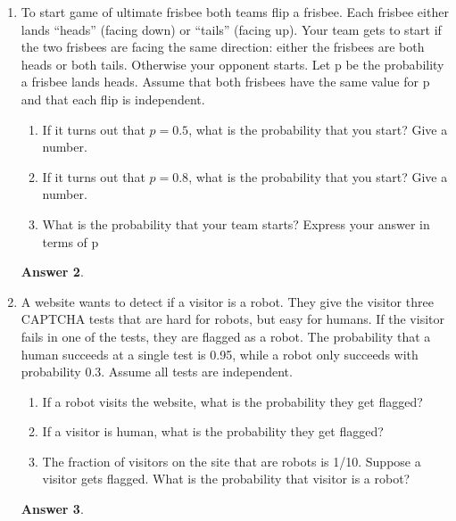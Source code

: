\documentclass[12pt]{article}
\renewcommand{\(}{\left(}
\renewcommand{\)}{\right)}
\theoremstyle{definition}
\newtheorem*{answer}{Answer}
\begin{document}
\begin{enumerate}
\begin{shaded}
\begin{answer}
    \end{answer}
    \end{shaded}
    \pagebreak
    \item To start game of ultimate frisbee both teams flip a frisbee. Each frisbee either lands ``heads''
(facing down) or ``tails'' (facing up). Your team gets to start if the two frisbees are facing the
same direction: either the frisbees are both heads or both tails. Otherwise your opponent starts.
Let p be the probability a frisbee lands heads. Assume that both frisbees have the same value
for p and that each flip is independent.
\begin{enumerate}
    \item If it turns out that $p = 0.5$, what is the probability that you start? Give a number.
    \item If it turns out that $p = 0.8$, what is the probability that you start? Give a number.
    \item What is the probability that your team starts? Express your answer in terms of p
\end{enumerate}

    \begin{shaded}
    \begin{answer}
    
    \end{answer}
    \end{shaded}
    \pagebreak
    \item A website wants to detect if a visitor is a robot. They give the visitor three CAPTCHA tests that are hard for robots, but easy for humans. If the visitor fails in one of the tests, they are flagged as a robot. The probability that a human succeeds at a single test is 0.95, while a robot only succeeds with probability 0.3. Assume all tests are independent.
    \begin{enumerate}
        \item If a robot visits the website, what is the probability they get flagged?
        \item If a visitor is human, what is the probability they get flagged?
        \item The fraction of visitors on the site that are robots is 1/10. Suppose a visitor gets flagged. What is the probability that visitor is a robot?
    \end{enumerate}
    
    \begin{shaded}
    \begin{answer}
    

\end{answer}
\end{shaded}
\end{enumerate}
\end{document}
